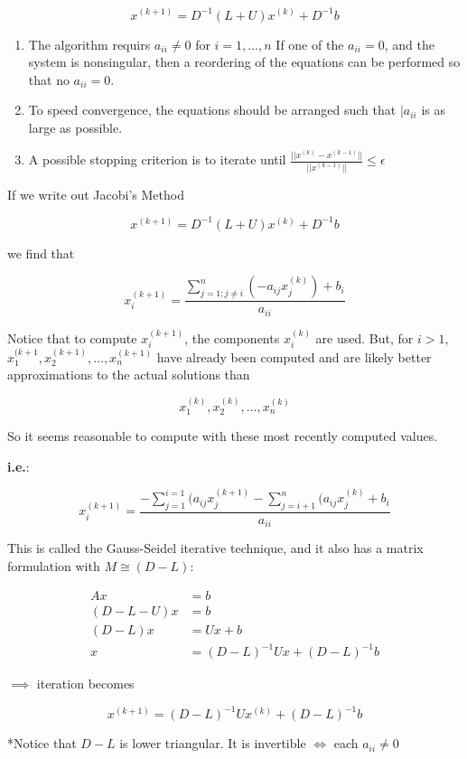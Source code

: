 \documentclass[12pt]{article}
\newcommand{\ie}{\textbf{i.e.}\xspace}
\begin{document}
\begin{equation*}
  x^{(k+1)} = D^{-1}(L+U)x^{(k)} + D^{-1}b
\end{equation*}

\begin{enumerate}
  \item The algorithm requirs $a_{ii} \neq 0$ for $i=1,\dots,n$ If one of the 
    $a_{ii} = 0$, and the system is nonsingular, then a reordering of the 
    equations can be performed so that no $a_{ii} = 0$.
  \item To speed convergence, the equations should be arranged such that
    $|a_{ii}$ is as large as possible.
  \item A possible stopping criterion is to iterate until
    $\frac{||x^{(k)}-x^{(k-1)}||}{||x^{(k-1)}||} \leq \epsilon$
\end{enumerate}

If we write out Jacobi's Method

\begin{equation*}
  x^{(k+1)} = D^{-1}(L+U)x^{(k)} + D^{-1}b
\end{equation*}

we find that

\begin{equation*}
  x_i^{(k+1)} = \frac{\sum_{j=1; j\ne i}^n (-a_{ij}x_j^{(k)}) +b_i}{a_{ii}}
\end{equation*}

Notice that to compute $x_i^{(k+1)}$, the components $x_i^{(k)}$ are used.
But, for $i>1$, $x_1^{(k+1}, x_2^{(k+1)}, \dots, x_n^{(k+1)}$ have already
been computed and are likely better approximations to the actual solutions than

\begin{equation*}
  x_1^{(k)}, x_2^{(k)}, \dots, x_n^{(k)}
\end{equation*}

So it seems reasonable to compute with these most recently computed values.

\ie:

\begin{equation*}
  x_i^{(k+1)} = \frac{-\sum_{j=1}^{i=1}(a_{ij}x_j^{(k+1)} - \sum_{j=i+1}^{n} (a_{ij} x_j^{(k)} +b_i}{a_{ii}}
\end{equation*}

This is called the Gauss-Seidel iterative technique, and it also has a matrix
formulation with $M\cong (D-L):$

\begin{align*}
  Ax &= b \\
  (D-L-U)x &= b \\
  (D-L)x &= Ux+b \\
  x &= (D-L)^{-1}Ux+(D-L)^{-1}b
\end{align*}

$\implies$ iteration becomes

\begin{equation*}
  x^{(k+1)} = (D-L)^{-1}Ux^{(k)} + (D-L)^{-1}b
\end{equation*}

*Notice that $D-L$ is lower triangular. It is invertible $\iff$ each $a_{ii}\ne 0$
\end{document}

